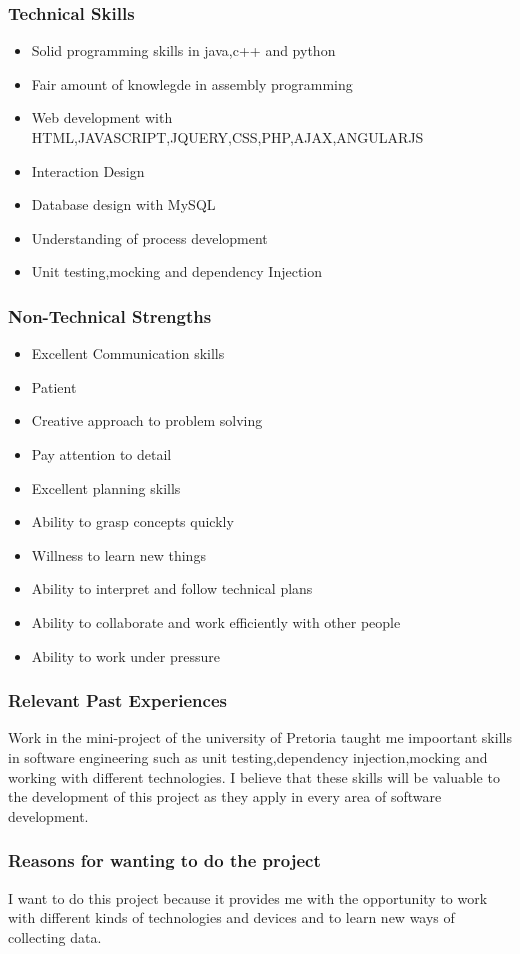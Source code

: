 \documentclass{scrartcl}
\begin{document}
\subsubsection{Technical Skills}
\begin{itemize}
\item Solid programming skills in java,c++ and python
\item Fair amount of knowlegde in assembly programming
\item Web development with HTML,JAVASCRIPT,JQUERY,CSS,PHP,AJAX,ANGULARJS
\item Interaction Design
\item Database design with MySQL
\item Understanding of process development
\item Unit testing,mocking and dependency Injection
\end{itemize}
\subsubsection{Non-Technical Strengths}
\begin{itemize}
\item Excellent Communication skills
\item Patient
\item Creative approach to problem solving
\item Pay attention to detail
\item Excellent planning skills
\item Ability to grasp concepts quickly
\item Willness to learn new things
\item Ability to interpret and follow technical plans
\item Ability to collaborate and work efficiently with other people
\item Ability to work under pressure
\end{itemize}
\subsubsection{Relevant Past Experiences}
Work in the mini-project of the university of Pretoria taught me impoortant skills in software engineering such as unit testing,dependency injection,mocking and working with different technologies. I believe that these skills will be valuable to the development of this project as they apply in every area of software development.
\subsubsection{Reasons for wanting to do the project}
I want to do this project because it provides me with the opportunity to work with different kinds of technologies and devices and to learn new ways of collecting data.
\newpage
\end{document}
